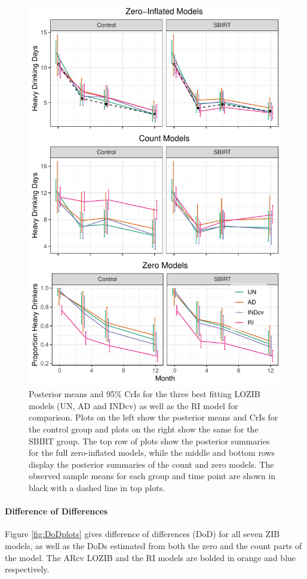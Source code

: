 \documentclass[12pt]{article}
\begin{document}
\begin{figure}
	\centering
	\includegraphics[scale = .8]{figures/mean_all_plot.pdf}
	\caption{Posterior means and 95\% CrIs for the three best fitting LOZIB models (UN, AD and INDcv) as well as the RI model for comparison. Plots on the left show the posterior means and CrIs for the control group and plots on the right show the same for the SBIRT group.  The top row of plots show the posterior summaries for the full zero-inflated models, while the middle and bottom rows display the posterior summaries of the count and zero models. The observed sample means for each group and time point are shown in black with a dashed line in top plots.}
	\label{fig:meanplots}
\end{figure}


\paragraph{Difference of Differences}
Figure \ref{fig:DoDplots} gives difference of differences (DoD) for all seven ZIB models, as well as the DoDs estimated from both the zero and the count parts of the model. The ARcv LOZIB and the RI models are bolded in orange and blue respectively.
\end{document}

